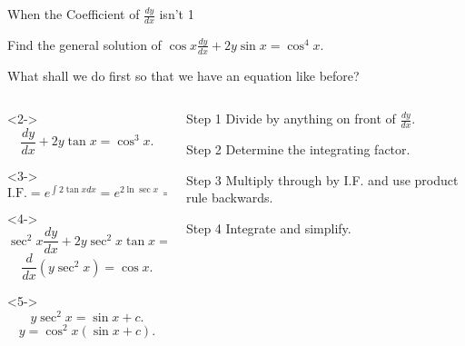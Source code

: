 \documentclass[8pt]{beamer}
\newcommand{\sol}[2][+]{
	\tikz[baseline]{\node[color=aa,fill=cc,rectangle,draw,anchor=base] {  {\onslide<#1->{#2}}  };}
}
\begin{document}
\begin{frame}[shrink]{When the Coefficient of $\frac{dy}{dx}$ isn't 1}
	\begin{problem}
		Find the general solution of $\cos x \frac{dy}{dx}+ 2y\sin x = \cos^4 x.$
	\end{problem}

	What shall we do first so that we have an equation like before? \sol{Divide by $\cos x$}

	\begin{columns}[T]
	\begin{column}{.6\linewidth}
	\begin{solution}<2->
		\[
		\frac{dy}{dx}+2y \tan x = \cos^3 x
		.\] 
	\end{solution}

	\begin{solution}<3->
		\[
			\text{I.F.}= e^{\int 2 \tan x dx}= e ^{2 \ln \sec x}=\sec^2x
		.\] 
	\end{solution}
	\begin{solution}<4->
		\[
		\sec^2 x \frac{dy}{dx} + 2y \sec^2x \tan x = \cos x 
		.\] 
		\[
			\frac{d}{dx}(y \sec^2 x)=\cos x
		.\] 
	\end{solution}
	\begin{solution}<5->
		\[
		y \sec^2x =\sin x +c
		.\] 
		\[
			y= \cos^2x(\sin x +c)
		.\] 
	\end{solution}
	\end{column}
	\begin{column}{.4\linewidth}
		\begin{block}{Step 1}
		Divide by anything on front of $\frac{dy}{dx}$.
	\end{block}
	\begin{block}{Step 2}
		Determine the integrating factor.
	\end{block}
	\begin{block}{Step 3}
		Multiply through by I.F. and use product rule backwards.
		
	\end{block}
	\begin{block}{Step 4}
		Integrate and simplify.
	\end{block}
	\end{column}
	\end{columns}


\end{frame}
\end{document}
